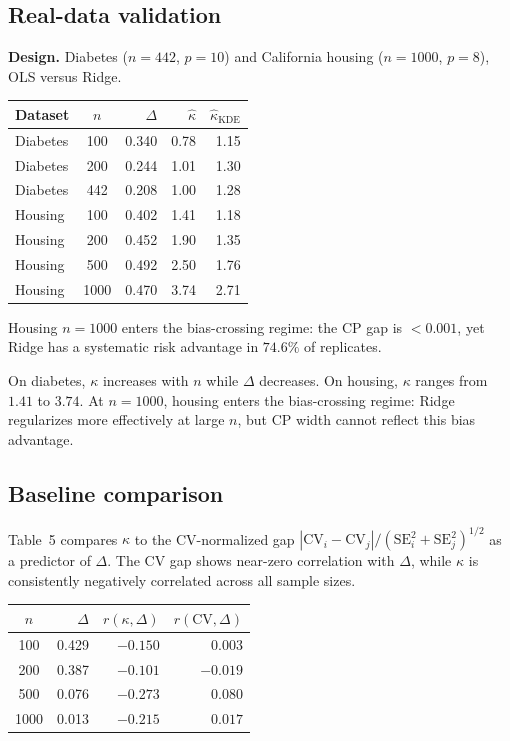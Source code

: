\documentclass[lineno]{biometrika}
\begin{document}
\subsection{Real-data validation}

\textbf{Design.} Diabetes ($n=442$, $p=10$) and California housing ($n=1000$, $p=8$), OLS versus Ridge.

\begin{table}
{\begin{tabular}{lcrrr}
Dataset & $n$ & $\Delta$ & $\hat\kappa$ & $\hat\kappa_{\text{KDE}}$ \\ \hline
Diabetes & 100 & 0.340 & 0.78 & 1.15 \\
Diabetes & 200 & 0.244 & 1.01 & 1.30 \\
Diabetes & 442 & 0.208 & 1.00 & 1.28 \\
Housing & 100 & 0.402 & 1.41 & 1.18 \\
Housing & 200 & 0.452 & 1.90 & 1.35 \\
Housing & 500 & 0.492 & 2.50 & 1.76 \\
Housing & 1000 & 0.470 & 3.74 & 2.71
\end{tabular}}
\label{tab:real}
\begin{tabnote}
Housing $n=1000$ enters the bias-crossing regime: the CP gap is $<0.001$, yet Ridge has a systematic risk advantage in $74.6\%$ of replicates.
\end{tabnote}
\end{table}

On diabetes, $\kappa$ increases with $n$ while $\Delta$ decreases. On housing, $\kappa$ ranges from $1.41$ to $3.74$. At $n=1000$, housing enters the bias-crossing regime: Ridge regularizes more effectively at large $n$, but CP width cannot reflect this bias advantage.

\subsection{Baseline comparison}

Table~5 compares $\kappa$ to the CV-normalized gap $|\text{CV}_i - \text{CV}_j| / (\text{SE}_i^2 + \text{SE}_j^2)^{1/2}$ as a predictor of $\Delta$. The CV gap shows near-zero correlation with $\Delta$, while $\kappa$ is consistently negatively correlated across all sample sizes.

\begin{table}
{\begin{tabular}{crrr}
$n$ & $\Delta$ & $r(\kappa,\Delta)$ & $r(\text{CV},\Delta)$ \\ \hline
100 & 0.429 & $-0.150$ & $0.003$ \\
200 & 0.387 & $-0.101$ & $-0.019$ \\
500 & 0.076 & $-0.273$ & $0.080$ \\
1000 & 0.013 & $-0.215$ & $0.017$
\end{tabular}}
\label{tab:cv}
\end{table}
\end{document}
